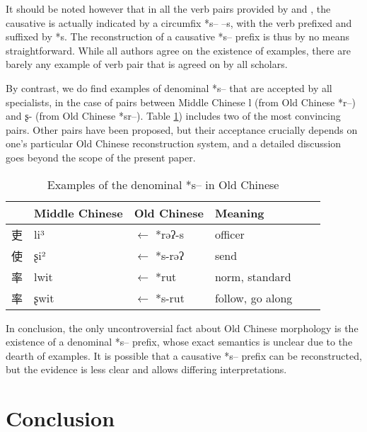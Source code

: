 \documentclass[oldfontcommands,oneside,a4paper,11pt]{article}
\newcommand{\ipa}[1]{{\phon \mbox{#1}}} %
\newcommand{\zh}[1]{{\cn #1}}
\begin{document}
It should be noted however that in all the verb pairs provided by \citealt{sagart99roc} and \citet{sagart12sprefix}, the causative is actually indicated by a circumfix *s-- --s, with the verb prefixed and suffixed by *s. The reconstruction of a causative *\ipa{s--} prefix is thus by no means straightforward. While all authors agree on the existence of examples, there are barely any example of verb pair that is agreed on by all scholars.

 By contrast, we do find examples of denominal *\ipa{s--} that are accepted by all specialists, in the case of pairs between Middle Chinese \ipa{l} (from Old Chinese *\ipa{r--}) and \ipa{ʂ-} (from Old Chinese *\ipa{sr--}). Table \ref{tab:denom.oc}) includes two of the most convincing pairs. Other pairs have been proposed, but their acceptance crucially depends on one's particular Old Chinese reconstruction system, and a detailed discussion goes beyond the scope of the present paper.  
  
  \begin{table}[h]
\caption{Examples of the denominal *\ipa{s--} in Old Chinese}\label{tab:denom.oc} \centering
\begin{tabular}{llllll}
\toprule 
  &Middle Chinese  &Old Chinese &Meaning \\
  \midrule
\zh{吏}& \ipa{li³} &$\leftarrow$ *\ipa{rəʔ-s}  & officer \\
\zh{使}& \ipa{ʂi²} &$\leftarrow$ *\ipa{s-rəʔ} &send  \\
\zh{率}& \ipa{lwit} &$\leftarrow$ *\ipa{rut} & norm, standard \\
\zh{率} &\ipa{ʂwit} &$\leftarrow$ *\ipa{s-rut} & follow, go along  \\
\bottomrule
\end{tabular}
\end{table}
 

 In conclusion, the only uncontroversial fact about Old Chinese morphology is the existence of a denominal *\ipa{s--} prefix, whose exact semantics is unclear due to the dearth of examples. It is possible that a causative *\ipa{s--} prefix can be reconstructed, but the evidence is less clear and allows differing interpretations.
  


\section{Conclusion}
\end{document}
